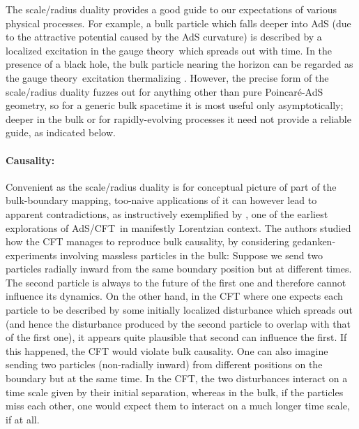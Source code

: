 \documentclass[12pt,a4paper]{article}
\def\AC{AdS/CFT}
\def\GT{gauge theory}
\def\Poinc{Poincar\' e}
\begin{document}
The scale/radius duality provides a good guide to our expectations of various physical processes.  For example, a bulk particle which falls deeper into AdS (due to the attractive potential caused by the AdS curvature) is described by a localized excitation in the \GT\ which spreads out with time.  In the presence of a black hole, the bulk particle nearing the horizon can be regarded as the \GT\ excitation thermalizing \cite{Banks:1998dd}.
However, the precise form of the scale/radius duality fuzzes out for anything other than pure \Poinc-AdS geometry, so for a generic bulk spacetime it is most useful only asymptotically; deeper in the bulk or for rapidly-evolving processes it need not provide a reliable guide, as indicated below.


\paragraph{Causality:}  %
Convenient as the scale/radius duality is for conceptual picture of part of the bulk-boundary mapping, too-naive applications of it  can however lead to apparent contradictions, as instructively exemplified by \cite{Horowitz:1999gf}, one of the earliest explorations of \AC\ in manifestly Lorentzian context.
The authors studied how the CFT manages to reproduce bulk causality, by considering gedanken-experiments involving massless particles in the bulk:  Suppose we send two particles radially inward from the same boundary position but at different times.  The second particle is always to the future of the first one and therefore cannot influence its dynamics.  On the other hand, in the CFT where one expects each particle to be described by  some initially localized disturbance which spreads out (and hence the disturbance produced by the second particle to overlap with that of the first one), it appears quite plausible that second can influence the first.  If this happened, the CFT would violate bulk causality.   One can also imagine sending two particles (non-radially inward) from different positions on the boundary but at the same time.  In the CFT, the two disturbances interact on a time scale given by their initial separation, whereas in the bulk, if the particles miss each other, one would  expect them to interact on a much longer time scale, if at all.
\end{document}
